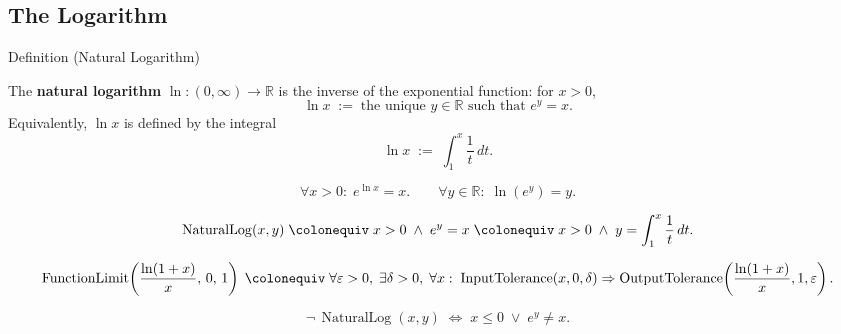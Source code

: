 
\subsection*{The Logarithm}
\label{sec:logarithmic}

\begin{definitionbox}{Definition (Natural Logarithm)}
\begin{definition}
\label{def:natural-logarithm}
The \textbf{natural logarithm} $\ln : (0,\infty) \to \mathbb{R}$ is
the inverse of the exponential function: for $x > 0$,
\[
  \ln x \;:=\; \text{the unique } y \in \mathbb{R}
  \text{ such that } e^y = x.
\]
Equivalently, $\ln x$ is defined by the integral
\[
  \ln x \;:=\; \int_1^x \frac{1}{t}\, dt.
\]
\end{definition}
\end{definitionbox}\begin{remark*}
\[
  \forall x > 0 :\; e^{\ln x} = x.
  \qquad
  \forall y \in \mathbb{R} :\; \ln(e^y) = y.
\]
\end{remark*}

\begin{remark*}
\[
  \operatorname{NaturalLog}(x, y)
  \;\colonequiv\;
  x > 0 \;\wedge\; e^y = x
  \;\colonequiv\;
  x > 0 \;\wedge\; y = \int_1^x \frac{1}{t}\,dt.
\]
\end{remark*}

\begin{remark*}
\[
  \operatorname{FunctionLimit}\!\left(\frac{\ln(1+x)}{x},\,0,\,1\right)
  \;\colonequiv\;
  \forall\varepsilon>0,\;\exists\delta>0,\;\forall x:\;
  \operatorname{InputTolerance}(x,0,\delta)
  \Rightarrow
  \operatorname{OutputTolerance}\!\left(\frac{\ln(1+x)}{x},1,\varepsilon\right).
\]
\end{remark*}

\begin{remark*}
\[
  \neg\,\operatorname{NaturalLog}(x,y)
  \;\iff\;
  x \leq 0 \;\vee\; e^y \neq x.
\]
\end{remark*}


